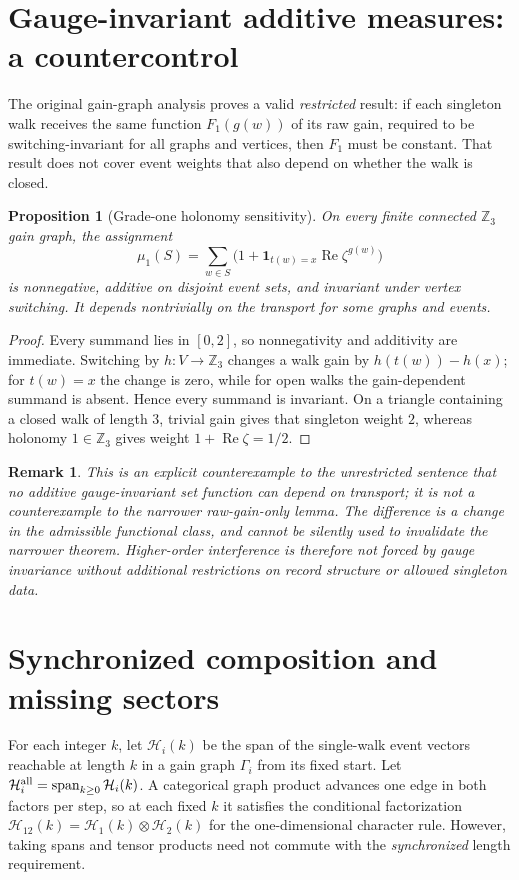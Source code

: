 \documentclass[11pt]{article}
\newtheorem{proposition}[theorem]{Proposition}
\newtheorem{remark}[theorem]{Remark}
\newcommand{\Z}{\mathbb Z}
\newcommand{\Hil}{\mathcal H}
\begin{document}
\section{Gauge-invariant additive measures: a countercontrol}
The original gain-graph analysis proves a valid \emph{restricted} result: if each singleton walk receives the same function $F_1(g(w))$ of its raw gain, required to be switching-invariant for all graphs and vertices, then $F_1$ must be constant. That result does not cover event weights that also depend on whether the walk is closed.

\begin{proposition}[Grade-one holonomy sensitivity]\label{prop:additive}
On every finite connected $\Z_3$ gain graph, the assignment
\begin{equation}
 \mu_1(S)=\sum_{w\in S}\Big(1+\mathbf 1_{t(w)=x}\operatorname{Re}\zeta^{g(w)}\Big)
 \label{eq:additive}
\end{equation}
is nonnegative, additive on disjoint event sets, and invariant under vertex switching. It depends nontrivially on the transport for some graphs and events.
\end{proposition}
\begin{proof}
Every summand lies in $[0,2]$, so nonnegativity and additivity are immediate. Switching by $h:V\to\Z_3$ changes a walk gain by $h(t(w))-h(x)$; for $t(w)=x$ the change is zero, while for open walks the gain-dependent summand is absent. Hence every summand is invariant. On a triangle containing a closed walk of length $3$, trivial gain gives that singleton weight $2$, whereas holonomy $1\in\Z_3$ gives weight $1+\operatorname{Re}\zeta=1/2$.\qedhere
\end{proof}
\begin{remark}
This is an explicit counterexample to the unrestricted sentence that \emph{no additive gauge-invariant set function can depend on transport}; it is not a counterexample to the narrower raw-gain-only lemma. The difference is a change in the admissible functional class, and cannot be silently used to invalidate the narrower theorem. Higher-order interference is therefore not forced by gauge invariance without additional restrictions on record structure or allowed singleton data.
\end{remark}

\section{Synchronized composition and missing sectors}
For each integer $k$, let $\Hil_i(k)$ be the span of the single-walk event vectors reachable at length $k$ in a gain graph $\Gamma_i$ from its fixed start. Let $\Hil_i^{\rm all}=\operatorname{span}_{k\ge0}\Hil_i(k)$. A categorical graph product advances one edge in both factors per step, so at each fixed $k$ it satisfies the conditional factorization $\Hil_{12}(k)=\Hil_1(k)\otimes\Hil_2(k)$ for the one-dimensional character rule. However, taking spans and tensor products need not commute with the \emph{synchronized} length requirement.
\end{document}
